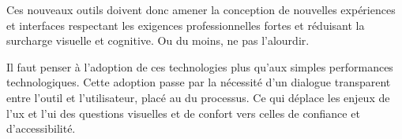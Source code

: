 Ces nouveaux outils doivent donc amener la conception de nouvelles expériences et interfaces respectant les exigences professionnelles fortes et réduisant la surcharge visuelle et cognitive. Ou du moins, ne pas l'alourdir. 

Il faut penser à l'adoption de ces technologies plus qu'aux simples performances technologiques. Cette adoption passe par la nécessité d'un dialogue transparent entre l'outil et l'utilisateur, placé au \coeur du processus. Ce qui déplace les enjeux de l'\gls{ux} et l'\gls{ui} des questions visuelles et de confort vers celles de confiance et d'accessibilité.